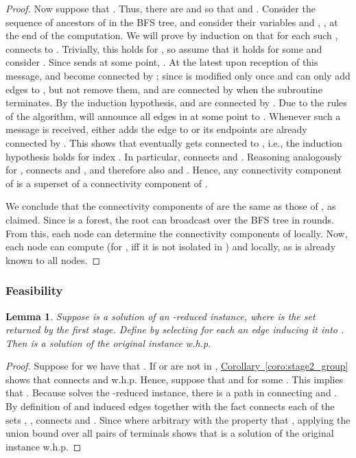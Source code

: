 \documentclass[letterpaper,11pt]{article}
\newtheorem{lemma}[theorem]{Lemma}
\newcommand{\namedref}[2]{\hyperref[#2]{#1~\ref*{#2}}}
\newcommand{\corollaryref}[1]{\namedref{Corollary}{#1}}
\begin{document}
\begin{proof}
Now suppose that . Thus, there are  and  so that  and .
Consider the sequence of ancestors  of  in the BFS
tree, and consider their variables  and , , at the end of the computation. We will prove by induction on
 that for each such ,  connects  to . Trivially, this holds for , so assume that it holds for some  and consider . Since  sends  at
some point, . At the latest upon reception of this
message,  and  become connected by ;
since  is modified only once and  can only add edges
to , but not remove them,  and  are
connected by  when the subroutine terminates. By the induction
hypothesis,  and  are connected by . Due to the
rules of the algorithm,  will announce all edges in  at
some point to . Whenever such a message is received,  either
adds the edge to  or its endpoints are already connected by
. This shows that  eventually gets connected to
, i.e., the induction hypothesis holds for index . In particular,
 connects  and . Reasoning analogously for
,  connects  and , and therefore also
 and . Hence, any connectivity component of  is
a superset of a connectivity component of .

We conclude that the connectivity components of  are the same
as those of , as claimed. Since  is a forest, the
root can broadcast  over the BFS tree in
 rounds. From this, each node can determine
the connectivity components of  locally. Now, each node
can compute  (for ,  iff it is not
isolated in ) and  locally, as  is
already known to all nodes.
\end{proof}

\subsubsection*{Feasibility}

\begin{lemma}\label{lemma:stage2_feasible}
Suppose  is a solution of an -reduced instance, where  is the set
returned by the first stage. Define  by selecting for each
 an edge  inducing it into . Then  is
a solution of the original instance w.h.p.
\end{lemma}
\begin{proof}
Suppose for  we have that . If  or  are
not in , \corollaryref{coro:stage2_group} shows that
 connects  and  w.h.p. Hence, suppose that  and  for some . This implies that
. Because  solves the -reduced
instance, there is a path in  connecting  and
. By definition of  and induced edges together with the fact 
connects each of the sets , ,  connects  and
. Since  where arbitrary with the property that
, applying the union bound over all pairs of terminals
shows that  is a solution of the original instance w.h.p.
\end{proof}
\end{document}

